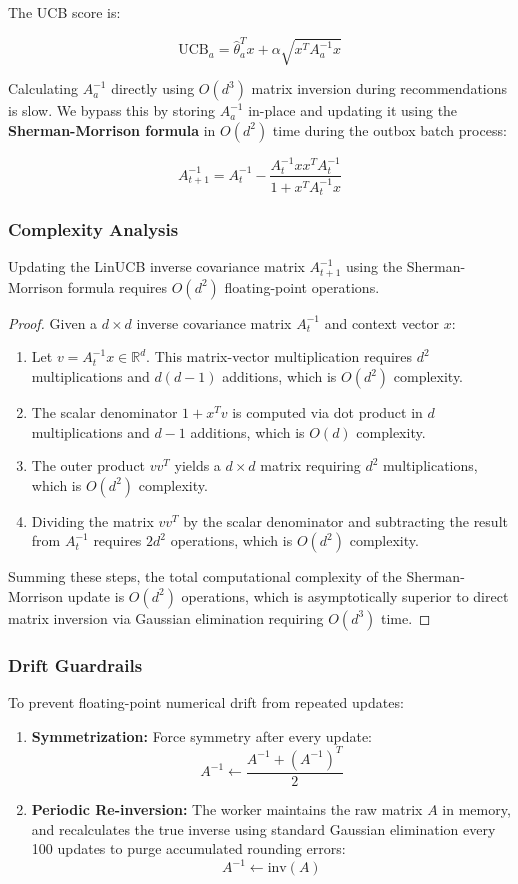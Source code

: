 \documentclass{article}
\begin{document}
The UCB score is:

\[\text{UCB}_a = \hat{\theta}_a^T x + \alpha \sqrt{x^T A_a^{-1} x}\]

Calculating $A_a^{-1}$ directly using $O(d^3)$ matrix inversion during recommendations is slow. We bypass this by storing $A_a^{-1}$ in-place and updating it using the \textbf{Sherman-Morrison formula} in $O(d^2)$ time during the outbox batch process:

\[A_{t+1}^{-1} = A_t^{-1} - \frac{A_t^{-1} x x^T A_t^{-1}}{1 + x^T A_t^{-1} x}\]

\subsubsection{Complexity Analysis}
\begin{proposition}
Updating the LinUCB inverse covariance matrix $A^{-1}_{t+1}$ using the Sherman-Morrison formula requires $O(d^2)$ floating-point operations.
\end{proposition}
\begin{proof}
Given a $d \times d$ inverse covariance matrix $A_t^{-1}$ and context vector $x$:
\begin{enumerate}
    \item Let $v = A_t^{-1} x \in \mathbb{R}^d$. This matrix-vector multiplication requires $d^2$ multiplications and $d(d-1)$ additions, which is $O(d^2)$ complexity.
    \item The scalar denominator $1 + x^T v$ is computed via dot product in $d$ multiplications and $d-1$ additions, which is $O(d)$ complexity.
    \item The outer product $v v^T$ yields a $d \times d$ matrix requiring $d^2$ multiplications, which is $O(d^2)$ complexity.
    \item Dividing the matrix $v v^T$ by the scalar denominator and subtracting the result from $A_t^{-1}$ requires $2d^2$ operations, which is $O(d^2)$ complexity.
\end{enumerate}
Summing these steps, the total computational complexity of the Sherman-Morrison update is $O(d^2)$ operations, which is asymptotically superior to direct matrix inversion via Gaussian elimination requiring $O(d^3)$ time.
\end{proof}

\subsubsection{Drift Guardrails}
To prevent floating-point numerical drift from repeated updates:
\begin{enumerate}
    \item \textbf{Symmetrization:} Force symmetry after every update:
   \[A^{-1} \leftarrow \frac{A^{-1} + (A^{-1})^T}{2}\]
    \item \textbf{Periodic Re-inversion:} The worker maintains the raw matrix $A$ in memory, and recalculates the true inverse using standard Gaussian elimination every 100 updates to purge accumulated rounding errors:
   \[A^{-1} \leftarrow \text{inv}(A)\]
\end{enumerate}
\end{document}
